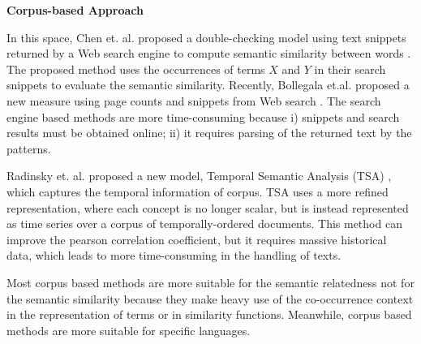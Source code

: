 {\noindent\textbf{Corpus-based Approach}}

In this space, Chen et. al. proposed a double-checking model
using text snippets returned by a Web search engine
to compute semantic similarity between words \cite{Chen:2006}.
The proposed method uses the occurrences of terms $X$ and $Y$
in their search snippets to evaluate the semantic similarity.
Recently, Bollegala et.al. proposed a new measure using
page counts and snippets from Web search \cite{Bollegala:2011}.
The search engine based methods are more time-consuming because
i) snippets and search results must be obtained online;
ii) it requires parsing of the returned text by the patterns.

Radinsky et. al. proposed
a new model, Temporal Semantic Analysis (TSA)
\cite{Kira:2011}, which captures the temporal information of corpus.
TSA uses a more refined representation, where each concept is no
longer scalar, but is instead represented as time series over a
corpus of temporally-ordered documents. This method can improve the
pearson correlation coefficient, but it requires massive historical data, which leads to more time-consuming in the handling of texts.

Most corpus based methods are more suitable for the semantic
relatedness not for the semantic similarity because they
make heavy use of the co-occurrence context in the representation
of terms or in similarity functions. Meanwhile, corpus based methods are more suitable for specific languages.
